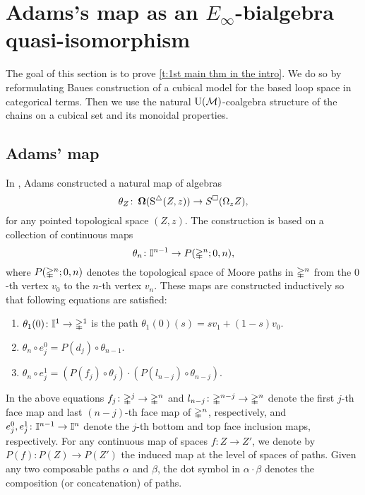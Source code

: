 
\section{Adams's map as an $E_{\infty}$-bialgebra quasi-isomorphism}

The goal of this section is to prove \cref{t:1st main thm in the intro}. We do so by reformulating Baues construction of a cubical model for the based loop space in categorical terms. Then we use the natural ${\operatorname{U}(\mathcal{M})}$-coalgebra structure of the chains on a cubical set and its monoidal properties.

\subsection{Adams' map}

In \cite{adams1956cobar}, Adams constructed a natural map of algebras
\begin{equation} \label{e:adams map 2}
\theta_Z \colon \operatorname{\mathbf{\Omega}}(\operatorname{S^{\triangle}}(Z, z)) \to S^{\square}(\Omega_z Z),
\end{equation}
for any pointed topological space $(Z, z)$.
The construction is based on a collection of continuous maps $$\theta_n \colon \mathbb{I}^{n-1} \to P(\mathbb{\Delta}^n;0,n),$$
where $P(\mathbb{\Delta}^n;0,n)$ denotes the topological space of Moore paths in $\mathbb{\Delta}^n$ from the $0$-th vertex $v_0$ to the $n$-th vertex $v_n$.
These maps are constructed inductively so that following equations are satisfied:
\begin{enumerate}
	\item $\theta_1(0)\colon \mathbb{I}^1 \to \mathbb{\Delta}^1$ is the path $\theta_1(0)(s) = sv_1 +(1-s)v_0$.
	\item $\theta_n \circ e_j^0 = P(d_j) \circ \theta_{n-1}$.
	\item $\theta_n \circ e_j^1 = (P(f_j) \circ \theta_j) \cdot (P(l_{n-j}) \circ \theta_{n-j})$.
\end{enumerate}
In the above equations $f_j\colon \mathbb{\Delta}^j \rightarrow \mathbb{\Delta}^n$ and $l_{n-j}\colon \mathbb{\Delta}^{n-j} \rightarrow \mathbb{\Delta}^n$ denote the first $j$-th face map and last $(n-j)$-th face map of $\mathbb{\Delta}^n$, respectively, and
$e_j^0,e_j^1\colon \mathbb{I}^{n-1} \rightarrow \mathbb{I}^{n}$ denote the $j$-th bottom and top face inclusion maps, respectively.
For any continuous map of spaces $f \colon Z \to Z'$, we denote by $P(f) \colon P(Z) \to P(Z')$ the induced map at the level of spaces of paths. Given any two composable paths $\alpha$ and $\beta$, the dot symbol in $\alpha \cdot \beta$ denotes the composition (or concatenation) of paths.

